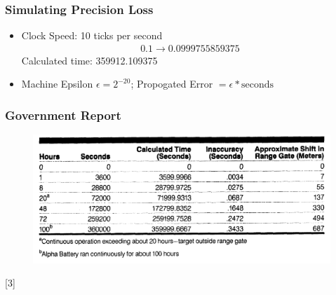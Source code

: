 \documentclass[10pt]{beamer}
\begin{document}
\begin{frame}
    \frametitle{Simulating Precision Loss}
    \begin{itemize}
        \item Clock Speed: 10 ticks per second
        \begin{align*}
            0.1 \to 0.0999755859375
        \end{align*}
        Calculated time: 359912.109375
        \item Machine Epsilon $\epsilon = 2^{-20}$;
        Propogated Error $= \epsilon * \text{seconds}$
    \end{itemize}

\end{frame}
\begin{frame}
    \frametitle{Government Report}
    \begin{figure}
        \centering
        \includegraphics[width=1.0\textwidth]{patriot.png}
    \end{figure}
    [3]
\end{frame}
\end{document}

